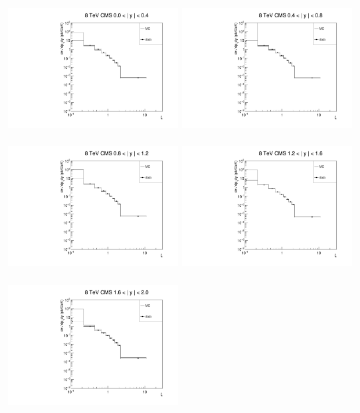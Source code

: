 \documentclass{article}
\begin{document}
\clearpage

\begin{figure}[h!]
\centering
\includegraphics[width = 0.4\textwidth]{xi_8_C_y1.pdf}
\includegraphics[width = 0.4\textwidth]{xi_8_C_y2.pdf}

\includegraphics[width = 0.4\textwidth]{xi_8_C_y3.pdf}
\includegraphics[width = 0.4\textwidth]{xi_8_C_y4.pdf}

\includegraphics[width = 0.4\textwidth]{xi_8_C_y5.pdf}
\end{figure}
\end{document}
